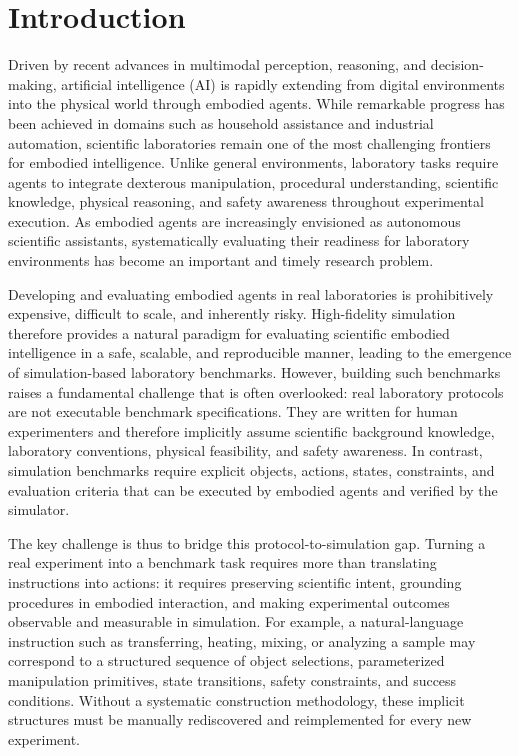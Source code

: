 \documentclass[sigconf]{acmart}
\begin{document}
\section{Introduction}
Driven by recent advances in multimodal perception, reasoning, and decision-making, artificial intelligence (AI) is rapidly extending from digital environments into the physical world through embodied agents. While remarkable progress has been achieved in domains such as household assistance and industrial automation, scientific laboratories remain one of the most challenging frontiers for embodied intelligence. Unlike general environments, laboratory tasks require agents to integrate dexterous manipulation, procedural understanding, scientific knowledge, physical reasoning, and safety awareness throughout experimental execution. As embodied agents are increasingly envisioned as autonomous scientific assistants, systematically evaluating their readiness for laboratory environments has become an important and timely research problem.

Developing and evaluating embodied agents in real laboratories is prohibitively expensive, difficult to scale, and inherently risky. High-fidelity simulation therefore provides a natural paradigm for evaluating scientific embodied intelligence in a safe, scalable, and reproducible manner, leading to the emergence of simulation-based laboratory benchmarks. However, building such benchmarks raises a fundamental challenge that is often overlooked: real laboratory protocols are not executable benchmark specifications. They are written for human experimenters and therefore implicitly assume scientific background knowledge, laboratory conventions, physical feasibility, and safety awareness. In contrast, simulation benchmarks require explicit objects, actions, states, constraints, and evaluation criteria that can be executed by embodied agents and verified by the simulator.

The key challenge is thus to bridge this protocol-to-simulation gap. Turning a real experiment into a benchmark task requires more than translating instructions into actions: it requires preserving scientific intent, grounding procedures in embodied interaction, and making experimental outcomes observable and measurable in simulation. For example, a natural-language instruction such as transferring, heating, mixing, or analyzing a sample may correspond to a structured sequence of object selections, parameterized manipulation primitives, state transitions, safety constraints, and success conditions. Without a systematic construction methodology, these implicit structures must be manually rediscovered and reimplemented for every new experiment.
\end{document}
